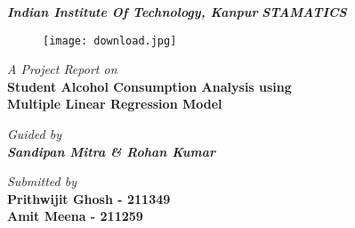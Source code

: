 \documentclass[A4paper,11pt]{report}
\begin{document}
		\begin{center}
		\centering
		\thispagestyle{empty}
			\textbf{\Huge \textit{Indian Institute Of Technology, Kanpur}}
			\linebreak
			\linebreak
			\linebreak
			\linebreak
			\textbf{\textit{\LARGE STAMATICS}}
			\linebreak
			\linebreak
			\linebreak
			
			\begin{figure}[H]
				\centering
				\texttt{[image: download.jpg]}
				\newline
				\newline
				\newline
			\end{figure}
		\begin{center}
			\Large 	\textit{A Project Report on} \\
			\textbf{\huge Student Alcohol Consumption Analysis using \\Multiple Linear Regression Model}
		\end{center}
		
		\begin{center}
		\Large \textit{Guided by}\\
		\Large \textbf{\textit{Sandipan Mitra \& Rohan Kumar}}
		\linebreak
		\linebreak
		\linebreak
		\end{center}
	\Large \textit{Submitted by}\\
		\huge \textbf{Prithwijit Ghosh - 211349}\\
		\huge \textbf{Amit Meena - 211259}\\
	\end{center}
	\newpage
\end{document}
